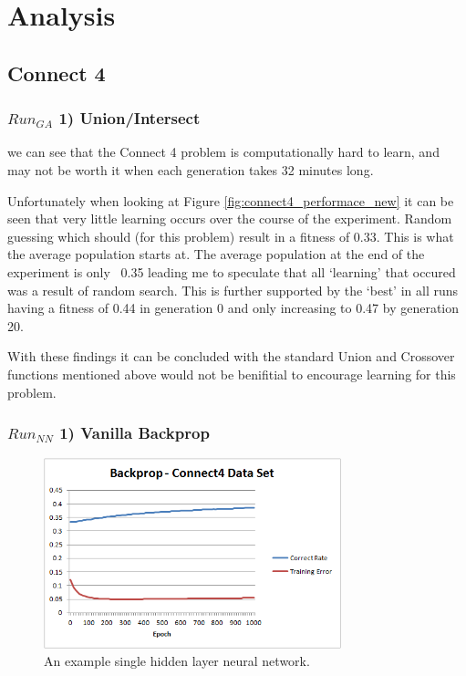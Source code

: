 \documentclass[journal]{IEEEtran}
\begin{document}
\section{Analysis}
  \subsection{Connect 4}
    \subsubsection*{$Run_{GA}$ 1) Union/Intersect}
      we can see that the Connect 4 problem is computationally hard to learn, and may not
    be worth it when each generation takes 32 minutes long.

      Unfortunately when looking at Figure \ref{fig:connect4_performace_new} it can be seen
    that very little learning occurs over the course of the experiment. Random guessing
    which should (for this problem) result in a fitness of 0.33. This is what the average
    population starts at. The average population at the end of the experiment is only ~0.35
    leading me to speculate that all `learning' that occured was a result of random search.
    This is further supported by the `best' in all runs having a fitness of 0.44 in generation 0 and only
    increasing to 0.47 by generation 20.

    With these findings it can be concluded with the standard Union and Crossover functions
    mentioned above would not be benifitial to encourage learning for this problem.

    \subsubsection*{$Run_{NN}$ 1) Vanilla Backprop}
      \begin{figure}[here]%
        \centering
        \includegraphics[width=3.4in]{brain_connect4}
        \caption{An example single hidden layer neural network.}
        \label{fig:brain_connect4}
      \end{figure}
\end{document}
